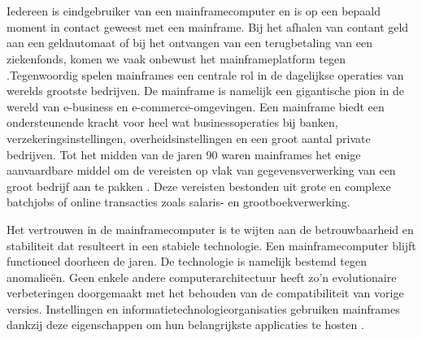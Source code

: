 \section{}

Iedereen is eindgebruiker van een mainframecomputer en is op een bepaald moment in contact geweest met een mainframe. Bij het afhalen van contant geld aan een geldautomaat of bij het ontvangen van een terugbetaling van een ziekenfonds, komen we vaak onbewust het mainframeplatform tegen \autocite{Ebbers2022}.Tegenwoordig spelen mainframes een centrale rol in de dagelijkse operaties van werelds grootste bedrijven. De mainframe is namelijk een gigantische pion in de wereld van e-business en e-commerce-omgevingen. Een mainframe biedt een ondersteunende kracht voor heel wat businessoperaties bij banken, verzekeringsinstellingen, overheidsinstellingen en een groot aantal private bedrijven. Tot het midden van de jaren 90 waren mainframes het enige aanvaardbare middel om de vereisten op vlak van gegevensverwerking van een groot bedrijf aan te pakken \autocite{Ebbers2022}. Deze vereisten bestonden uit grote en complexe batchjobs of online transacties zoals salaris- en grootboekverwerking.

Het vertrouwen in de mainframecomputer is te wijten aan de betrouwbaarheid en stabiliteit dat resulteert in een stabiele technologie. Een mainframecomputer blijft functioneel doorheen de jaren. De technologie is namelijk bestemd tegen anomalieën. Geen enkele andere computerarchitectuur heeft zo'n evolutionaire verbeteringen doorgemaakt met het behouden van de compatibiliteit van vorige versies. Instellingen en informatietechnologieorganisaties gebruiken mainframes dankzij deze eigenschappen om hun belangrijkste applicaties te hosten \autocite{Ebbers2022}. 

\newpage 

\section{}
\label{sec:probleemstelling}

